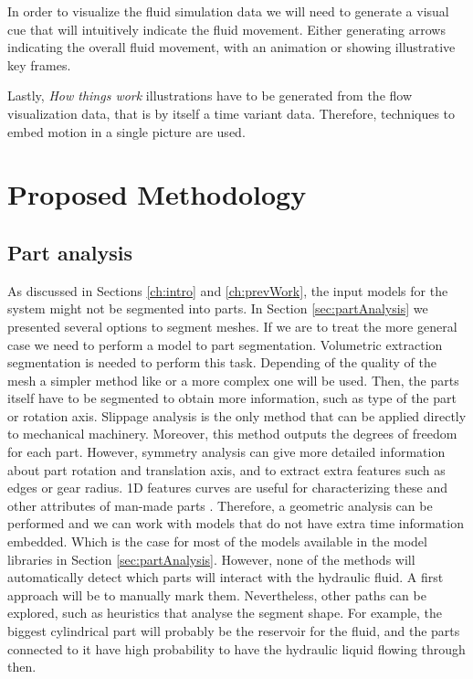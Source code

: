 In order to visualize the fluid simulation data we will need to generate a visual cue that will intuitively indicate the fluid movement.
Either generating arrows indicating the overall fluid movement, with an animation or showing illustrative key frames.

Lastly, \textit{How things work} illustrations have to be generated from the flow visualization data, that is by itself a time variant data.
Therefore, techniques to embed motion in a single picture are used.


\section{Proposed Methodology}

\subsection{Part analysis}

As discussed in Sections \ref{ch:intro} and \ref{ch:prevWork}, the input models for the system might not be segmented into parts.
In Section \ref{sec:partAnalysis} we presented several options to segment meshes.
If we are to treat the more general case we need to perform a model to part segmentation.
Volumetric extraction segmentation is needed to perform this task.
Depending of the quality of the mesh a simpler method like \cite{Attene2006} or a more complex one \cite{Yumer2012} will be used.
Then, the parts itself have to be segmented to obtain more information, such as type of the part or rotation axis.
Slippage analysis \cite{Yi2014} is the only method that can be applied directly to mechanical machinery.
Moreover, this method outputs the degrees of freedom for each part.
However, symmetry analysis \cite{Mitra2007} can give more detailed information about part rotation and translation axis, and to extract extra features such as edges or gear radius.
1D features curves are useful for characterizing these and other attributes of man-made parts \cite{Gal2009}.
Therefore, a geometric analysis can be performed and we can work with models that do not have extra time information embedded.
Which is the case for most of the models available in the model libraries in Section \ref{sec:partAnalysis}.
However, none of the methods will automatically detect which parts will interact with the hydraulic fluid.
A first approach will be to manually mark them.
Nevertheless, other paths can be explored, such as heuristics that analyse the segment shape.
For example, the biggest cylindrical part will probably be the reservoir for the fluid, and the parts connected to it have high probability to have the hydraulic liquid flowing through then.

